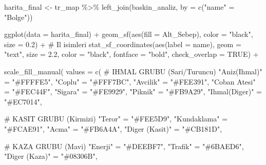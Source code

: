 \documentclass[
  11pt,
  a4paper,
  DIV=11,
  numbers=noendperiod]{scrartcl}
\newenvironment{Shaded}{\begin{snugshade}}{\end{snugshade}}
\newcommand{\AttributeTok}[1]{\textcolor[rgb]{0.40,0.45,0.13}{#1}}
\newcommand{\CommentTok}[1]{\textcolor[rgb]{0.37,0.37,0.37}{#1}}
\newcommand{\ConstantTok}[1]{\textcolor[rgb]{0.56,0.35,0.01}{#1}}
\newcommand{\FloatTok}[1]{\textcolor[rgb]{0.68,0.00,0.00}{#1}}
\newcommand{\FunctionTok}[1]{\textcolor[rgb]{0.28,0.35,0.67}{#1}}
\newcommand{\NormalTok}[1]{\textcolor[rgb]{0.00,0.23,0.31}{#1}}
\newcommand{\OtherTok}[1]{\textcolor[rgb]{0.00,0.23,0.31}{#1}}
\newcommand{\SpecialCharTok}[1]{\textcolor[rgb]{0.37,0.37,0.37}{#1}}
\newcommand{\StringTok}[1]{\textcolor[rgb]{0.13,0.47,0.30}{#1}}
\begin{document}
\begin{Shaded}
\begin{Highlighting}[]
\NormalTok{harita\_final }\OtherTok{\textless{}{-}}\NormalTok{ tr\_map }\SpecialCharTok{\%\textgreater{}\%}
  \FunctionTok{left\_join}\NormalTok{(baskin\_analiz, }\AttributeTok{by =} \FunctionTok{c}\NormalTok{(}\StringTok{"name"} \OtherTok{=} \StringTok{"Bolge"}\NormalTok{))}

\FunctionTok{ggplot}\NormalTok{(}\AttributeTok{data =}\NormalTok{ harita\_final) }\SpecialCharTok{+}
  \FunctionTok{geom\_sf}\NormalTok{(}\FunctionTok{aes}\NormalTok{(}\AttributeTok{fill =}\NormalTok{ Alt\_Sebep), }\AttributeTok{color =} \StringTok{"black"}\NormalTok{, }\AttributeTok{size =} \FloatTok{0.2}\NormalTok{) }\SpecialCharTok{+}
  \CommentTok{\# Il isimleri}
  \FunctionTok{stat\_sf\_coordinates}\NormalTok{(}\FunctionTok{aes}\NormalTok{(}\AttributeTok{label =}\NormalTok{ name), }\AttributeTok{geom =} \StringTok{"text"}\NormalTok{, }\AttributeTok{size =} \FloatTok{2.2}\NormalTok{, }\AttributeTok{color =} \StringTok{"black"}\NormalTok{, }\AttributeTok{fontface =} \StringTok{"bold"}\NormalTok{, }\AttributeTok{check\_overlap =} \ConstantTok{TRUE}\NormalTok{) }\SpecialCharTok{+}
  
  \FunctionTok{scale\_fill\_manual}\NormalTok{(}
    \AttributeTok{values =} \FunctionTok{c}\NormalTok{(}
      \CommentTok{\# IHMAL GRUBU (Sari/Turuncu)}
      \StringTok{"Aniz(Ihmal)"} \OtherTok{=} \StringTok{"\#FFFFE5"}\NormalTok{, }\StringTok{"Coplu"} \OtherTok{=} \StringTok{"\#FFF7BC"}\NormalTok{, }\StringTok{"Avcilik"} \OtherTok{=} \StringTok{"\#FEE391"}\NormalTok{, }
      \StringTok{"Coban Atesi"} \OtherTok{=} \StringTok{"\#FEC44F"}\NormalTok{, }\StringTok{"Sigara"} \OtherTok{=} \StringTok{"\#FE9929"}\NormalTok{, }\StringTok{"Piknik"} \OtherTok{=} \StringTok{"\#FB9A29"}\NormalTok{, }
      \StringTok{"Ihmal(Diger)"} \OtherTok{=} \StringTok{"\#EC7014"}\NormalTok{, }
      
      \CommentTok{\# KASIT GRUBU (Kirmizi)}
      \StringTok{"Teror"} \OtherTok{=} \StringTok{"\#FEE5D9"}\NormalTok{, }\StringTok{"Kundaklama"} \OtherTok{=} \StringTok{"\#FCAE91"}\NormalTok{, }\StringTok{"Acma"} \OtherTok{=} \StringTok{"\#FB6A4A"}\NormalTok{, }\StringTok{"Diger (Kasit)"} \OtherTok{=} \StringTok{"\#CB181D"}\NormalTok{,}
      
      \CommentTok{\# KAZA GRUBU (Mavi)}
      \StringTok{"Enerji"} \OtherTok{=} \StringTok{"\#DEEBF7"}\NormalTok{, }\StringTok{"Trafik"} \OtherTok{=} \StringTok{"\#6BAED6"}\NormalTok{, }\StringTok{"Diger (Kaza)"} \OtherTok{=} \StringTok{"\#08306B"}\NormalTok{,}
      

\end{Highlighting}
\end{Shaded}
\end{document}
